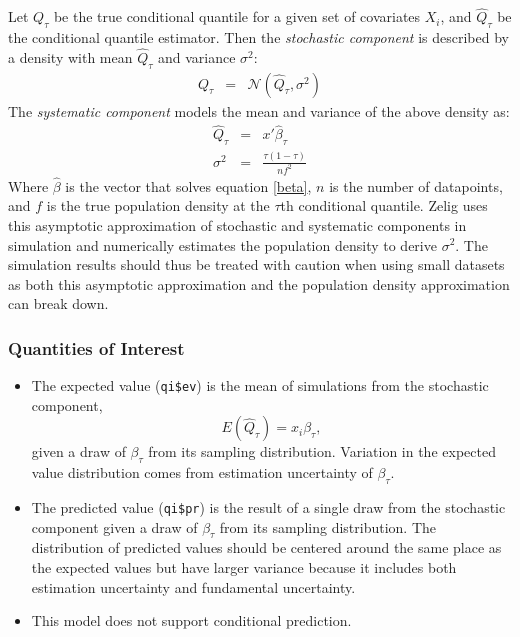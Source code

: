 Let $Q_\tau$ be the true conditional quantile for a given set of covariates $X_i$, and $\hat Q_\tau$
be the conditional quantile estimator. Then the \emph{stochastic component} is described
by a density with mean $\hat Q_\tau$ and variance $\sigma^2$:
\begin{eqnarray*}
    Q_\tau &=& \mathcal{N}(\hat Q_\tau, \sigma^2)
\end{eqnarray*}
The \emph{systematic component} models the mean and variance of the above density as:
\begin{eqnarray*}
    \hat Q_\tau &=& x'\hat\beta_\tau\\
    \sigma^2 &=& \frac{\tau(1-\tau)}{n f^2}
\end{eqnarray*}
Where $\hat\beta$ is the vector that solves equation \ref{beta}, $n$ is the number of
datapoints, and $f$ is the true population density at the $\tau$th conditional quantile.
Zelig uses this asymptotic approximation of stochastic and systematic components in
simulation and numerically estimates the population density to derive $\sigma^2$. The
simulation results should thus be treated with caution when using small datasets as both
this asymptotic approximation and the population density approximation can break down.

\subsubsection{Quantities of Interest} 
\begin{itemize}
\item The expected value ({\tt qi\$ev}) is the mean of simulations from the stochastic
component,  
\begin{equation*}
E(\hat Q_\tau) = x_i \beta_\tau,
\end{equation*}
given a draw of $\beta_\tau$ from its sampling distribution. Variation in the expected
value distribution comes from estimation uncertainty of $\beta_\tau$.

\item The predicted value ({\tt qi\$pr}) is the result of a single draw from the
stochastic component given a draw of $\beta_\tau$ from its sampling distribution. The
distribution of predicted values should be centered around the same place as the
expected values but have larger variance because it includes both estimation
uncertainty and fundamental uncertainty.

\item This model does not support conditional prediction.
\end{itemize}

